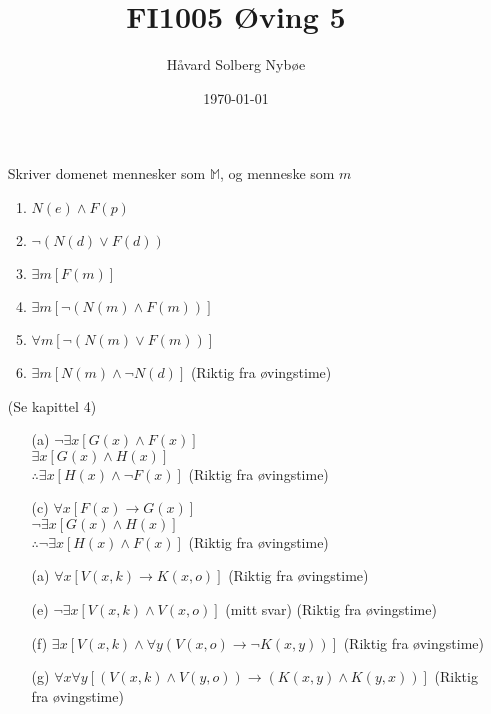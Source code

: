 \documentclass[a4paper, 12pt]{article}  %
\title{FI1005 Øving 5}                         %
\author{Håvard Solberg Nybøe}           %
\date{\today}                           %
\begin{document}
\maketitle


\begin{enumerate}
    \item [\boxed{1}] Skriver domenet mennesker som \(\mathbb{M}\), og menneske som \(m\)
    \begin{enumerate}
        \item \(N(e) \land F(p)\)
        \item \(\neg(N(d) \lor F(d))\)
        \item \(\exists m [F(m)]\)
        \item \(\exists m [\neg(N(m) \land F(m))]\)
        \item \(\forall m [\neg(N(m) \lor F(m))]\)
        \item \(\exists m [N(m) \land \neg N(d)] \) (Riktig fra øvingstime)
    \end{enumerate}
    \item [\boxed{2}] (Se kapittel 4)
    \begin{enumerate}
        \item [(a)]
        \(\neg\exists x [G(x) \land F(x)]\) \\
        \(\exists x [G(x) \land H(x)]\) \\
        \(\therefore\exists x [H(x) \land \neg F(x)]\) (Riktig fra øvingstime)
        \item [(c)]
        \(\forall x [F(x) \to G(x)]\) \\
        \(\neg\exists x [G(x) \land H(x)]\) \\
        \(\therefore\neg\exists x [H(x) \land F(x)]\) (Riktig fra øvingstime)
    \end{enumerate}
    \item [\boxed{3}]
    \begin{enumerate}
        \item [(a)]
        \(\forall x [V(x,k) \to K(x,o)] \) (Riktig fra øvingstime)
        \item [(e)]
        \(\neg\exists x [V(x,k) \land V(x,o)]\) (mitt svar) (Riktig fra øvingstime)
        \item [(f)]
        \(\exists x [V(x,k) \land \forall y (V(x,o) \to \neg K(x,y))]\) (Riktig fra øvingstime)
        \item [(g)]
        \(\forall x \forall y [(V(x,k) \land V(y,o)) \to (K(x,y) \land K(y,x))] \) (Riktig fra øvingstime)
    \end{enumerate}
\end{enumerate}

\end{document}
